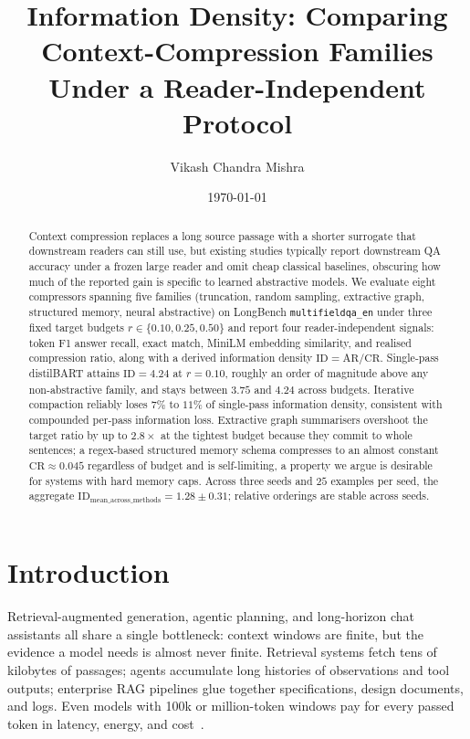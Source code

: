 \documentclass[11pt]{article}
\title{Information Density: Comparing Context-Compression Families Under a Reader-Independent Protocol}
\author[1]{Vikash Chandra Mishra}
\affil[1]{Independent\\\texttt{vikash@vizuara.com}}
\date{\today}
\begin{document}
\maketitle

\begin{abstract}
Context compression replaces a long source passage with a shorter
surrogate that downstream readers can still use, but existing studies
typically report downstream QA accuracy under a frozen large reader
and omit cheap classical baselines, obscuring how much of the
reported gain is specific to learned abstractive models. We evaluate
eight compressors spanning five families (truncation, random sampling,
extractive graph, structured memory, neural abstractive) on LongBench
\texttt{multifieldqa\_en} under three fixed target budgets
$r \in \{0.10, 0.25, 0.50\}$ and report four reader-independent
signals: token F1 answer recall, exact match, MiniLM embedding
similarity, and realised compression ratio, along with a derived
information density $\mathrm{ID} = \mathrm{AR} / \mathrm{CR}$. Single-pass
distilBART attains \textbf{$\mathrm{ID} = 4.24$} at $r = 0.10$, roughly
an order of magnitude above any non-abstractive family, and stays between
$3.75$ and $4.24$ across budgets. Iterative compaction reliably loses
$7\%$ to $11\%$ of single-pass information density, consistent with
compounded per-pass information loss. Extractive graph summarisers
overshoot the target ratio by up to $2.8\times$ at the tightest budget
because they commit to whole sentences; a regex-based structured memory schema compresses
to an almost constant $\mathrm{CR} \approx 0.045$ regardless of
budget and is self-limiting, a property we argue is desirable for
systems with hard memory caps. Across three seeds and $25$ examples
per seed, the aggregate
$\mathrm{ID}_{\mathrm{mean\_across\_methods}} = \mathbf{1.28 \pm 0.31}$;
relative orderings are stable across seeds.
\end{abstract}

\section{Introduction}
\label{sec:introduction}

Retrieval-augmented generation, agentic planning, and long-horizon chat
assistants all share a single bottleneck: context windows are finite, but
the evidence a model needs is almost never finite. Retrieval systems fetch
tens of kilobytes of passages; agents accumulate long histories of
observations and tool outputs; enterprise RAG pipelines glue together
specifications, design documents, and logs. Even models with 100k or
million-token windows pay for every passed token in latency, energy, and
cost~\citep{dao2022flashattention,beltagy2020longformer,zaheer2020bigbird}.
\end{document}
